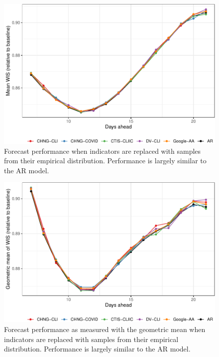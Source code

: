 \documentclass[9pt,twoside,lineno]{pnas-new}
\begin{document}
\begin{figure}

{\centering \includegraphics[width=\textwidth]{fig/fcast-booted-1} 

}

\caption{Forecast performance when indicators are replaced with samples from their empirical distribution. Performance is largely similar to the AR model.}\label{fig:fcast-booted}
\end{figure}

\clearpage

\begin{figure}

{\centering \includegraphics[width=\textwidth]{fig/fcast-booted-adjusted-1} 

}

\caption{Forecast performance as measured with the geometric mean when indicators are replaced with samples from their empirical distribution. Performance is largely similar to the AR model.}\label{fig:fcast-booted-adjusted}
\end{figure}
\end{document}
